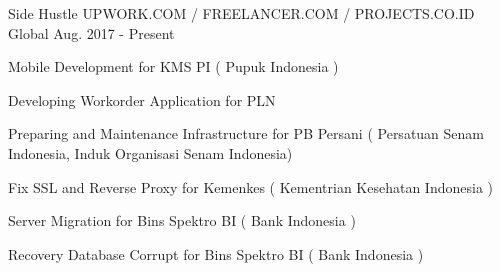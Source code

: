 \begin{cventries}
\cventry
  {Side Hustle} %
  {UPWORK.COM / FREELANCER.COM / PROJECTS.CO.ID } %
  {Global} %
  {Aug. 2017 - Present} %
  {
    \begin{cvitems} %
      \item {Mobile Development for KMS PI ( Pupuk Indonesia ) }
      \item {Developing Workorder Application for PLN }
      \item {Preparing and Maintenance Infrastructure for PB Persani ( Persatuan Senam Indonesia, Induk Organisasi Senam Indonesia) }
      \item {Fix SSL and Reverse Proxy for Kemenkes ( Kementrian Kesehatan Indonesia ) }
      \item {Server Migration for Bins Spektro BI ( Bank Indonesia ) }
      \item {Recovery Database Corrupt for Bins Spektro BI ( Bank Indonesia ) }
    \end{cvitems}
  }


\end{cventries}
